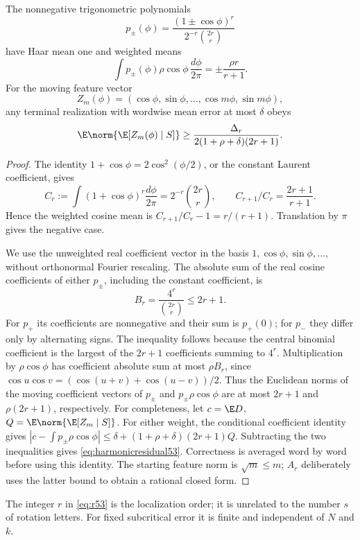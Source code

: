 \begin{lemma}\label{lem:harmonic53}
The nonnegative trigonometric polynomials
\[
 p_\pm(\phi)=\frac{(1\pm\cos\phi)^r}{2^{-r}\binom{2r}{r}}
\]
have Haar mean one and weighted means
\[
 \int p_\pm(\phi)\rho\cos\phi\,\frac{d\phi}{2\pi}
                         =\pm\frac{\rho r}{r+1}.
\]
For the moving feature vector
\[
 Z_m(\phi)=(\cos\phi,\sin\phi,\ldots,\cos m\phi,\sin m\phi),
\]
any terminal realization with wordwise mean error at most $\delta$ obeys
\begin{equation}\label{eq:harmonicresidual53}
 \E\norm{\E[Z_m(\phi)\mid S]}\ge
 \frac{\Delta_r}{2(1+\rho+\delta)(2r+1)}.
\end{equation}
\end{lemma}
\begin{proof}
The identity $1+\cos\phi=2\cos^2(\phi/2)$, or the constant Laurent coefficient, gives
\[
 C_r:=\int(1+\cos\phi)^r\frac{d\phi}{2\pi}
            =2^{-r}\binom{2r}{r},\qquad
 C_{r+1}/C_r=\frac{2r+1}{r+1}.
\]
Hence the weighted cosine mean is $C_{r+1}/C_r-1=r/(r+1)$. Translation by $\pi$ gives the negative case.

We use the unweighted real coefficient vector in the basis $1,\cos\phi,\sin\phi,\ldots$, without orthonormal Fourier rescaling. The absolute sum of the real cosine coefficients of either $p_\pm$, including the constant coefficient, is
\[
 B_r=\frac{4^r}{\binom{2r}{r}}\le2r+1.
\]
For $p_+$ its coefficients are nonnegative and their sum is $p_+(0)$; for $p_-$ they differ only by alternating signs. The inequality follows because the central binomial coefficient is the largest of the $2r+1$ coefficients summing to $4^r$. Multiplication by $\rho\cos\phi$ has coefficient absolute sum at most $\rho B_r$, since $\cos u\cos v=(\cos(u+v)+\cos(u-v))/2$. Thus the Euclidean norms of the moving coefficient vectors of $p_\pm$ and $p_\pm\rho\cos\phi$ are at most $2r+1$ and $\rho(2r+1)$, respectively. For completeness, let $c=\E D$, $Q=\E\norm{\E[Z_m\mid S]}$. For either weight, the conditional coefficient identity gives $|c-\int p_\pm\rho\cos\phi|\le\delta+(1+\rho+\delta)(2r+1)Q$. Subtracting the two inequalities gives \eqref{eq:harmonicresidual53}. Correctness is averaged word by word before using this identity. The starting feature norm is $\sqrt m\le m$; $A_r$ deliberately uses the latter bound to obtain a rational closed form.
\end{proof}

The integer $r$ in \eqref{eq:r53} is the localization order; it is unrelated to the number $s$ of rotation letters. For fixed subcritical error it is finite and independent of $N$ and $k$.

